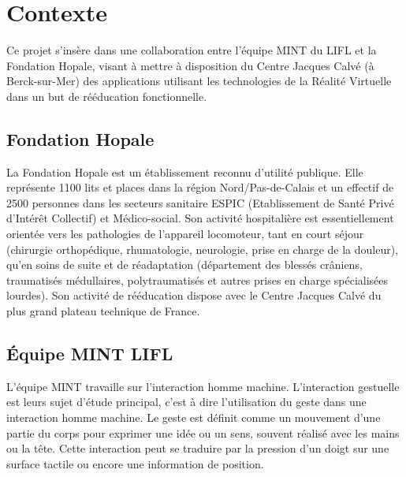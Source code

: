 \chapter{Contexte}

Ce projet s'insère dans une collaboration entre l'équipe MINT du LIFL et la Fondation Hopale, visant à mettre à disposition du Centre Jacques Calvé (à Berck-sur-Mer) des applications utilisant les technologies de la Réalité Virtuelle dans un but de rééducation fonctionnelle.

\section{Fondation Hopale}

La Fondation Hopale est un établissement reconnu d'utilité publique. Elle représente 1100 lits et places dans la région Nord/Pas-de-Calais et un effectif de 2500 personnes dans les secteurs sanitaire ESPIC (Etablissement de Santé Privé d'Intérêt Collectif) et Médico-social. Son activité hospitalière est essentiellement orientée vers les pathologies de l’appareil locomoteur, tant en court séjour (chirurgie orthopédique, rhumatologie, neurologie, prise en charge de la douleur), qu’en soins de suite et de réadaptation (département des blessés crâniens, traumatisés médullaires, polytraumatisés et autres prises en charge spécialisées lourdes). Son activité de rééducation dispose avec le Centre Jacques Calvé du plus grand plateau technique de France.

\section{Équipe MINT LIFL}

L'équipe MINT travaille sur l'interaction homme machine. L'interaction gestuelle est leurs sujet d'étude principal, c'est à dire l'utilisation du geste dans une interaction homme machine. Le geste est définit comme un mouvement d'une partie du corps pour exprimer une idée ou un sens, souvent réalisé avec les mains ou la tête. Cette interaction peut se traduire par la pression d'un doigt sur une surface tactile ou encore une information de position.
